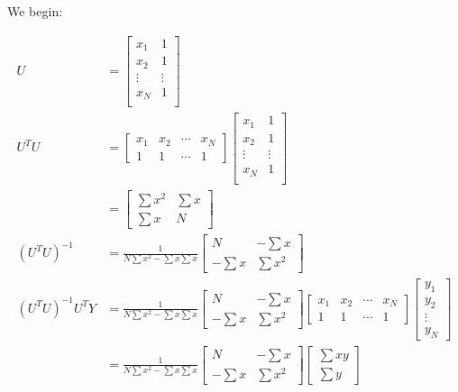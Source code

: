 \documentclass{article}
\begin{document}
We begin:

\begin{align*}
U &= 
\begin{bmatrix}
x_1    & 1 \\
x_2    & 1 \\
\vdots & \vdots \\
x_N    & 1 \\
\end{bmatrix} \\
U^T U &= \begin{bmatrix}
x_1 & x_2 & \cdots & x_N \\
1   & 1   & \cdots & 1
\end{bmatrix} \begin{bmatrix}
x_1    & 1 \\
x_2    & 1 \\
\vdots & \vdots \\
x_N    & 1 \\
\end{bmatrix} \\
&= \begin{bmatrix}
\sum x^2 & \sum x \\
\sum x   & N
\end{bmatrix} \\
(U^T U)^{-1} &= \frac{1}{N \sum x^2 - \sum x \sum x} \begin{bmatrix}
N        & - \sum x \\
- \sum x & \sum x^2
\end{bmatrix} \\ 
(U^T U)^{-1} U^T Y &= \frac{1}{N \sum x^2 - \sum x \sum x} \begin{bmatrix}
N        & - \sum x \\
- \sum x & \sum x^2
\end{bmatrix} \begin{bmatrix}
x_1 & x_2 & \cdots & x_N \\
1   & 1   & \cdots & 1
\end{bmatrix} \begin{bmatrix}
y_1 \\
y_2 \\
\vdots \\
y_N
\end{bmatrix} \\
&= \frac{1}{N \sum x^2 - \sum x \sum x} \begin{bmatrix}
N        & - \sum x \\
- \sum x & \sum x^2
\end{bmatrix} \begin{bmatrix}
\sum x y \\
\sum y
\end{bmatrix}
\end{align*}
\end{document}
